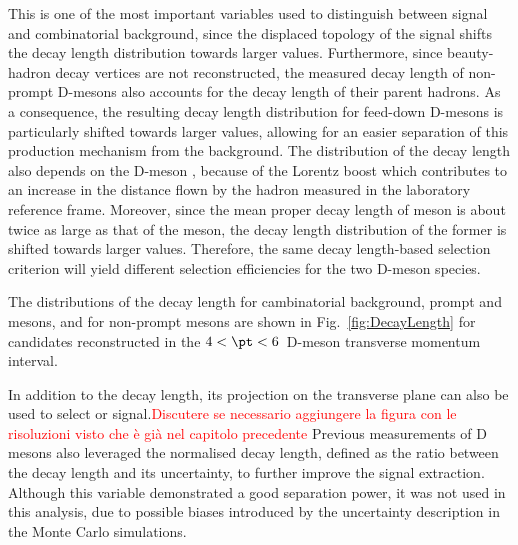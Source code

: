 This is one of the most important variables used to distinguish between signal and combinatorial background, since the displaced topology of the signal shifts the decay length distribution towards larger values. Furthermore, since beauty-hadron decay vertices are not reconstructed, the measured decay length of non-prompt D-mesons also accounts for the decay length of their parent hadrons. As a consequence, the resulting decay length distribution for feed-down D-mesons is particularly shifted towards larger values, allowing for an easier separation of this production mechanism from the background. The distribution of the decay length also depends on the D-meson \pt, because of the Lorentz boost which contributes to an increase in the distance flown by the hadron measured in the laboratory reference frame. Moreover, since the mean proper decay length of \dpl meson is about twice as large as that of the \ds meson, the decay length distribution of the former is shifted towards larger values. Therefore, the same decay length-based selection criterion will yield different selection efficiencies for the two D-meson species.

The distributions of the decay length for cambinatorial background, prompt \ds and \dpl mesons, and for non-prompt \ds mesons are shown in Fig.~\ref{fig:DecayLength} for candidates reconstructed in the $4 < \pt < 6$~\gevc D-meson transverse momentum interval. 

In addition to the decay length, its projection on the transverse plane can also be used to select \ds or \dpl signal.\textcolor{red}{Discutere se necessario aggiungere la figura con le risoluzioni visto che è già nel capitolo precedente} %
Previous measurements of D mesons also leveraged the normalised decay length, defined as the ratio between the decay length and its uncertainty, to further improve the signal extraction. Although this variable demonstrated a good separation power, it was not used in this analysis, due to possible biases introduced by the uncertainty description in the Monte Carlo simulations.

